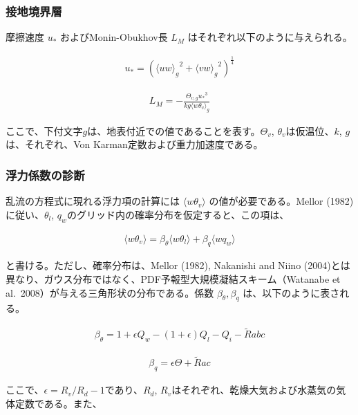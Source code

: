 \hypertarget{ux63a5ux5730ux5883ux754cux5c64}{%
\subsubsection{接地境界層}\label{ux63a5ux5730ux5883ux754cux5c64}}

摩擦速度 \(u_*\) およびMonin-Obukhov長 \(L_M\)
はそれぞれ以下のように与えられる。

\begin{eqnarray}u_*=\left({\langle uw \rangle_g}^2+{\langle vw \rangle_g}^2 \right)^\frac{1}{4}\end{eqnarray}

\begin{eqnarray}L_M=-\frac{\Theta_{v,g} {u_*}^3}{kg \langle w\theta_v \rangle_g}\end{eqnarray}

ここで、下付文字\(g\)は、地表付近での値であることを表す。\(\Theta_v\),
\(\theta_v\)は仮温位、\(k\), \(g\)は、それぞれ、Von
Karman定数および重力加速度である。

\hypertarget{ux6d6eux529bux4fc2ux6570ux306eux8a3aux65ad}{%
\subsubsection{浮力係数の診断}\label{ux6d6eux529bux4fc2ux6570ux306eux8a3aux65ad}}

乱流の方程式に現れる浮力項の計算には \(\langle w\theta_v \rangle\)
の値が必要である。Mellor (1982)に従い、\(\theta_l\),
\(q_w\)のグリッド内の確率分布を仮定すると、この項は、

\begin{eqnarray}\langle w\theta_v \rangle=\beta_\theta \langle w\theta_l \rangle + \beta_q \langle wq_w \rangle\end{eqnarray}

と書ける。ただし、確率分布は、Mellor (1982), Nakanishi and Niino
(2004)とは異なり、ガウス分布ではなく、PDF予報型大規模凝結スキーム（Watanabe
et al.~2008）が与える三角形状の分布である。係数
\(\beta_\theta , \beta_q\) は、以下のように表される。

\begin{eqnarray}\beta_\theta=1+\epsilon Q_w-(1+\epsilon)Q_l-Q_i-\tilde{R}abc\end{eqnarray}

\begin{eqnarray}\beta_q=\epsilon \Theta +\tilde{R}ac\end{eqnarray}

ここで、\(\epsilon=R_v/R_d-1\)であり、\(R_d\),
\(R_v\)はそれぞれ、乾燥大気および水蒸気の気体定数である。また、

